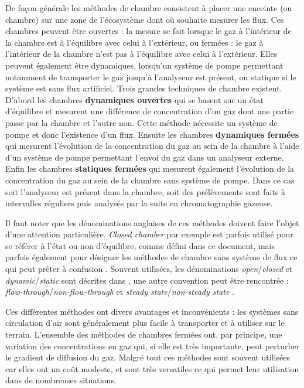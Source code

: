 De façon générale les méthodes de chambre consistent à placer une enceinte (ou chambre) sur une zone de l'écosystème dont où souhaite mesurer les flux.
Ces chambres peuvent être ouvertes : la mesure se fait lorsque le gaz à l'intérieur de la chambre est à l'équilibre avec celui à l'extérieur, ou fermées : le gaz à l'intérieur de la chambre n'est pas à l'équilibre avec celui à l'extérieur.
Elles peuvent également être dynamiques, lorsqu'un système de pompe permettant notamment de transporter le gaz jusqu'à l'analyseur est présent, ou statique si le système est sans flux artificiel.
Trois grandes techniques de chambre existent.
D'abord les chambres \textbf{dynamiques ouvertes} qui se basent sur un état d'équilibre et mesurent une différence de concentration d'un gaz dont une partie passe par la chambre et l'autre non. 
Cette méthode nécessite un système de pompe et donc l'existence d'un flux.
Ensuite les chambres \textbf{dynamiques fermées} qui mesurent l'évolution de la concentration du gaz au sein de la chambre à l'aide d'un système de pompe permettant l'envoi du gaz dans un analyseur externe.
Enfin les chambres \textbf{statiques fermées} qui mesurent également l'évolution de la concentration du gaz au sein de la chambre sans système de pompe.
Dans ce cas soit l'analyseur est présent dans la chambre, soit des prélèvements sont faits à intervalles réguliers puis analysés par la suite en chromatographie gazeuse.

Il faut noter que les dénominations anglaises de ces méthodes doivent faire l'objet d'une attention particulière.
\textit{Closed chamber} par exemple est parfois utilisé pour se référer à l'état ou non d'équilibre, comme défini dans ce document, mais parfois également pour désigner les méthodes de chambre sans système de flux ce qui peut prêter à confusion \citep{pumpanen2004}.
Souvent utilisées, les dénominations \textit{open}/\textit{closed} et \textit{dynamic}/\textit{static} sont décrites dans \citep{luo2006161}, une autre convention peut être rencontrée : \textit{flow-through}/\textit{non-flow-through} et \textit{steady state}/\textit{non-steady state} \citep{livingston1995}.

Ces différentes méthodes ont divers avantages et inconvénients : les systèmes sans circulation d'air sont généralement plus facile à transporter et à utiliser sur le terrain.
L'ensemble des méthodes de chambres fermées ont, par principe, une variation des concentrations en gaz qui, si elle est très importante, peut perturber le gradient de diffusion du gaz.
Malgré tout ces méthodes sont souvent utilisées car elles ont un coût modeste, et sont très versatiles ce qui permet leur utilisation dans de nombreuses situations.

